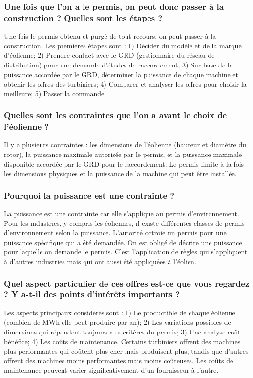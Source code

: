 \subsubsection{Une fois que l'on a le permis, on peut donc passer à la construction ? Quelles sont les étapes ?}

Une fois le permis obtenu et purgé de tout recours, on peut passer à la construction. Les premières étapes sont : 1) Décider du modèle et de la marque d'éolienne; 2) Prendre contact avec le GRD (gestionnaire du réseau de distribution) pour une demande d'études de raccordement; 3) Sur base de la puissance accordée par le GRD, déterminer la puissance de chaque machine et obtenir les offres des turbiniers; 4) Comparer et analyser les offres pour choisir la meilleure; 5) Passer la commande.

\subsubsection{Quelles sont les contraintes que l'on a avant le choix de l'éolienne ?}

Il y a plusieurs contraintes : les dimensions de l'éolienne (hauteur et diamètre du rotor), la puissance maximale autorisée par le permis, et la puissance maximale disponible accordée par le GRD pour le raccordement. Le permis limite à la fois les dimensions physiques et la puissance de la machine qui peut être installée.

\subsubsection{Pourquoi la puissance est une contrainte ?}

La puissance est une contrainte car elle s'applique au permis d'environnement. Pour les industries, y compris les éoliennes, il existe différentes classes de permis d'environnement selon la puissance. L'autorité octroie un permis pour une puissance spécifique qui a été demandée. On est obligé de décrire une puissance pour laquelle on demande le permis. C'est l'application de règles qui s'appliquent à d'autres industries mais qui ont aussi été appliquées à l'éolien.

\subsubsection{Quel aspect particulier de ces offres est-ce que vous regardez ? Y a-t-il des points d'intérêts importants ?}

Les aspects principaux considérés sont : 1) Le productible de chaque éolienne (combien de MWh elle peut produire par an); 2) Les variations possibles de dimensions qui répondent toujours aux critères du permis; 3) Une analyse coût-bénéfice; 4) Les coûts de maintenance. Certains turbiniers offrent des machines plus performantes qui coûtent plus cher mais produisent plus, tandis que d'autres offrent des machines moins performantes mais moins coûteuses. Les coûts de maintenance peuvent varier significativement d'un fournisseur à l'autre.

